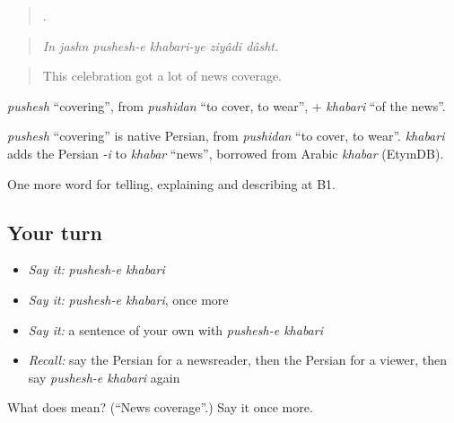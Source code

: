 \begin{quote}
     .
\end{quote}

\begin{quote}
\emph{In jashn pushesh-e khabari-ye ziyâdi dâsht.}
\end{quote}

\begin{quote}
This celebration got a lot of news coverage.
\end{quote}

\emph{pushesh} \textquotedblleft{}covering\textquotedblright{}, from \emph{pushidan} \textquotedblleft{}to cover, to wear\textquotedblright{}, + \emph{khabari} \textquotedblleft{}of the news\textquotedblright{}.

\begin{cousinweb}
\emph{pushesh} \textquotedblleft{}covering\textquotedblright{} is native Persian, from \emph{pushidan} \textquotedblleft{}to cover, to wear\textquotedblright{}. \emph{khabari} adds the Persian \emph{-i} to \emph{khabar} \textquotedblleft{}news\textquotedblright{}, borrowed from Arabic \emph{khabar} (EtymDB).
\end{cousinweb}

\begin{grammarlens}[title={What you've built}]
One more word for telling, explaining and describing at B1.
\end{grammarlens}

\subsection*{Your turn}
\begin{itemize}
\raggedright
  \item \emph{Say it:} \emph{pushesh-e khabari}
  \item \emph{Say it:} \emph{pushesh-e khabari}, once more
  \item \emph{Say it:} a sentence of your own with \emph{pushesh-e khabari}
  \item \emph{Recall:} say the Persian for a newsreader, then the Persian for a viewer, then say \emph{pushesh-e khabari} again
\end{itemize}

\begin{tcolorbox}[breakable,colback=teal!4,colframe=teal!35!black,title={Before you move on}]
What does   mean? (\textquotedblleft{}News coverage\textquotedblright{}.) Say it once more.
\end{tcolorbox}

